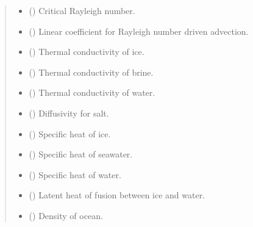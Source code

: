 \documentclass[a4paper,11pt,english,openany]{sphinxmanual}
\begin{document}
\begin{fulllineitems}
\begin{quote}
\begin{description}
\begin{itemize}
\item {} 
\sphinxAtStartPar
{} () \textendash{} Critical Rayleigh number.

\item {} 
\sphinxAtStartPar
{} () \textendash{} Linear coefficient for Rayleigh number driven advection.

\item {} 
\sphinxAtStartPar
{} () \textendash{} Thermal conductivity of ice.

\item {} 
\sphinxAtStartPar
{} () \textendash{} Thermal conductivity of brine.

\item {} 
\sphinxAtStartPar
{} () \textendash{} Thermal conductivity of water.

\item {} 
\sphinxAtStartPar
{} () \textendash{} Diffusivity for salt.

\item {} 
\sphinxAtStartPar
{} () \textendash{} Specific heat of ice.

\item {} 
\sphinxAtStartPar
{} () \textendash{} Specific heat of seawater.

\item {} 
\sphinxAtStartPar
{} () \textendash{} Specific heat of water.

\item {} 
\sphinxAtStartPar
{} () \textendash{} Latent heat of fusion between ice and water.

\item {} 
\sphinxAtStartPar
{} () \textendash{} Density of ocean.


\end{itemize}
\end{description}
\end{quote}
\end{fulllineitems}
\end{document}
